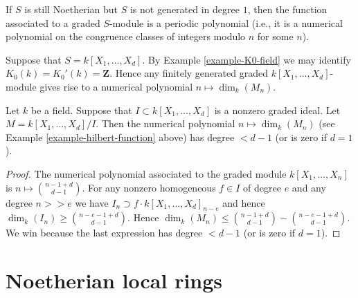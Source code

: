 \begin{remark}
\label{remark-period-polynomial}
If $S$ is still Noetherian but $S$ is not generated in degree $1$,
then the function associated to a graded $S$-module is a periodic
polynomial (i.e., it is a numerical polynomial on the
congruence classes of integers modulo $n$ for some $n$).
\end{remark}

\begin{example}
\label{example-hilbert-function}
Suppose that $S = k[X_1, \ldots, X_d]$.
By Example \ref{example-K0-field} we may identify
$K_0(k) = K_0'(k) = \mathbf{Z}$. Hence any finitely
generated graded $k[X_1, \ldots, X_d]$-module
gives rise to a numerical polynomial
$n \mapsto \dim_k(M_n)$.
\end{example}

\begin{lemma}
\label{lemma-quotient-smaller-d}
Let $k$ be a field. Suppose that $I \subset k[X_1, \ldots, X_d]$
is a nonzero graded ideal. Let $M = k[X_1, \ldots, X_d]/I$.
Then the numerical polynomial $n \mapsto \dim_k(M_n)$ (see
Example \ref{example-hilbert-function} above)
has degree $ < d - 1$ (or is zero if $d = 1$).
\end{lemma}

\begin{proof}
The numerical polynomial associated to the graded module
$k[X_1, \ldots, X_n]$ is $n \mapsto \binom{n - 1 + d}{d - 1}$.
For any nonzero homogeneous $f \in I$ of degree $e$
and any degree $n >> e$ we have $I_n \supset f \cdot k[X_1, \ldots, X_d]_{n-e}$
and hence $\dim_k(I_n) \geq \binom{n - e - 1 + d}{d - 1}$. Hence
$\dim_k(M_n) \leq \binom{n - 1 + d}{d - 1} - \binom{n - e - 1 + d}{d - 1}$.
We win because the last expression
has degree $ < d - 1$ (or is zero if $d = 1$).
\end{proof}








\section{Noetherian local rings}
\label{section-Noetherian-local}

